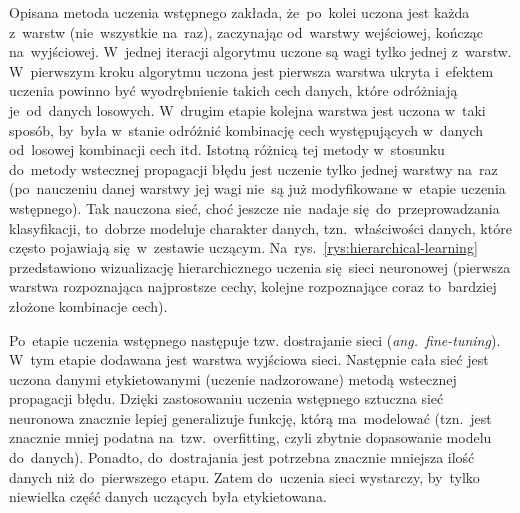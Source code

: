 Opisana metoda uczenia wstępnego zakłada, że~po~kolei uczona jest każda
z~warstw (nie~wszystkie na~raz), zaczynając od~warstwy wejściowej, kończąc
na~wyjściowej. W~jednej iteracji algorytmu uczone są wagi tylko jednej z~warstw.
W~pierwszym kroku algorytmu uczona jest pierwsza warstwa ukryta i~efektem
uczenia powinno być wyodrębnienie takich cech danych, które odróżniają
je~od~danych losowych. W~drugim etapie kolejna warstwa jest uczona w~taki
sposób, by~była w~stanie odróżnić kombinację cech występujących w~danych
od~losowej kombinacji cech itd. Istotną różnicą tej metody w~stosunku do~metody
wstecznej propagacji błędu jest uczenie tylko jednej warstwy na~raz
(po~nauczeniu danej warstwy jej wagi nie~są już modyfikowane w~etapie uczenia
wstępnego). Tak nauczona sieć, choć jeszcze nie~nadaje się~do~przeprowadzania
klasyfikacji, to~dobrze modeluje charakter danych, tzn.~właściwości danych,
które często pojawiają się~w~zestawie uczącym. Na~rys.~\ref{rys:hierarchical-learning} przedstawiono wizualizację
hierarchicznego uczenia się~sieci neuronowej (pierwsza warstwa rozpoznająca najprostsze cechy, kolejne rozpoznające
coraz to~bardziej złożone kombinacje cech).

Po~etapie uczenia wstępnego następuje tzw. dostrajanie sieci
(\textit{ang.~fine-tuning}). W~tym etapie dodawana jest warstwa wyjściowa sieci.
Następnie cała sieć jest uczona danymi etykietowanymi (uczenie nadzorowane)
metodą wstecznej propagacji błędu. Dzięki zastosowaniu uczenia wstępnego
sztuczna sieć neuronowa znacznie lepiej generalizuje funkcję, którą ma~modelować
(tzn.~jest znacznie mniej podatna na~tzw.~overfitting, czyli zbytnie dopasowanie modelu do~danych).
Ponadto, do~dostrajania jest potrzebna znacznie mniejsza ilość danych niż do~pierwszego etapu. Zatem
do~uczenia sieci wystarczy, by~tylko niewielka część danych uczących była
etykietowana.

